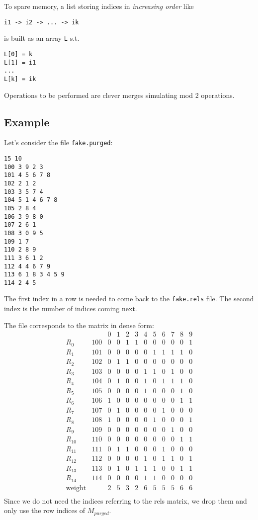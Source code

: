 \documentclass{article}
\begin{document}
To spare memory, a list storing indices in {\em increasing order} like
\begin{verbatim}
i1 -> i2 -> ... -> ik
\end{verbatim}
is built as an array \verb+L+ s.t.
\begin{verbatim}
L[0] = k
L[1] = i1
...
L[k] = ik
\end{verbatim}
Operations to be performed are clever merges simulating mod 2
operations.

\subsection{Example}

Let's consider the file \verb+fake.purged+:
\begin{verbatim}
15 10
100 3 9 2 3
101 4 5 6 7 8
102 2 1 2
103 3 5 7 4
104 5 1 4 6 7 8
105 2 8 4
106 3 9 8 0
107 2 6 1
108 3 0 9 5
109 1 7
110 2 8 9
111 3 6 1 2
112 4 4 6 7 9
113 6 1 8 3 4 5 9
114 2 4 5
\end{verbatim}
The first index in a row is needed to come back to the \verb+fake.rels+
file. The second index is the number of indices coming next.

The file corresponds to the matrix in dense form:
$$
\begin{array}{l|l|cccccccccc}
& & 0 & 1 & 2 & 3 & 4 & 5 & 6 & 7 & 8 & 9\\\hline
R_{0} & 100 & 0 & 0 & 1 & 1 & 0 & 0 & 0 & 0 & 0 & 1\\
R_{1} & 101 & 0 & 0 & 0 & 0 & 0 & 1 & 1 & 1 & 1 & 0\\
R_{2} & 102 & 0 & 1 & 1 & 0 & 0 & 0 & 0 & 0 & 0 & 0\\
R_{3} & 103 & 0 & 0 & 0 & 0 & 1 & 1 & 0 & 1 & 0 & 0\\
R_{4} & 104 & 0 & 1 & 0 & 0 & 1 & 0 & 1 & 1 & 1 & 0\\
R_{5} & 105 & 0 & 0 & 0 & 0 & 1 & 0 & 0 & 0 & 1 & 0\\
R_{6} & 106 & 1 & 0 & 0 & 0 & 0 & 0 & 0 & 0 & 1 & 1\\
R_{7} & 107 & 0 & 1 & 0 & 0 & 0 & 0 & 1 & 0 & 0 & 0\\
R_{8} & 108 & 1 & 0 & 0 & 0 & 0 & 1 & 0 & 0 & 0 & 1\\
R_{9} & 109 & 0 & 0 & 0 & 0 & 0 & 0 & 0 & 1 & 0 & 0\\
R_{10} & 110 & 0 & 0 & 0 & 0 & 0 & 0 & 0 & 0 & 1 & 1\\
R_{11} & 111 & 0 & 1 & 1 & 0 & 0 & 0 & 1 & 0 & 0 & 0\\
R_{12} & 112 & 0 & 0 & 0 & 0 & 1 & 0 & 1 & 1 & 0 & 1\\
R_{13} & 113 & 0 & 1 & 0 & 1 & 1 & 1 & 0 & 0 & 1 & 1\\
R_{14} & 114 & 0 & 0 & 0 & 0 & 1 & 1 & 0 & 0 & 0 & 0\\ \hline
\text{weight} & & 2 & 5 & 3 & 2 & 6 & 5 & 5 & 5 & 6 & 6 \\
\end{array}
$$
Since we do not need the indices referring to the rels matrix, we drop
them and only use the row indices of $M_{purged}$.
\end{document}
